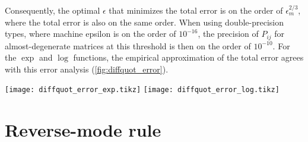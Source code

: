 \documentclass[../../main.tex]{subfiles}
\begin{document}
\begin{refsection}
	Consequently, the optimal $\epsilon$ that minimizes the total error is on the order of $\epsilon_m^{2/3}$, where the total error is also on the same order.
	When using double-precision types, where machine epsilon is on the order of $10^{-16}$, the precision of $P_{ij}$ for almost-degenerate matrices at this threshold is then on the order of $10^{-10}$.
	For the $\exp$ and $\log$ functions, the empirical approximation of the total error agrees with this error analysis (\cref{fig:diffquot_error}).

	\begin{figure*}%
		\centering
		\texttt{[image: diffquot\_error\_exp.tikz]}
		\texttt{[image: diffquot\_error\_log.tikz]}
		\caption[Absolute actual and predicted error of the difference quotient approximation]{
			Absolute actual and predicted error of the difference quotient approximation for $\exp (0)$ (\emph{left}) and $\log (1)$ (\emph{right}).
			Actual error is defined as the difference of the difference quotient \cref{diffquot} and its approximation \cref{diffquotapprox}.
			Predicted error is defined by \cref{diffquotapproxerr}.
		}
		\label{fig:diffquot_error}
	\end{figure*}

	\section{Reverse-mode rule}\label{reverse-mode-rule-1}


\end{refsection}
\end{document}
